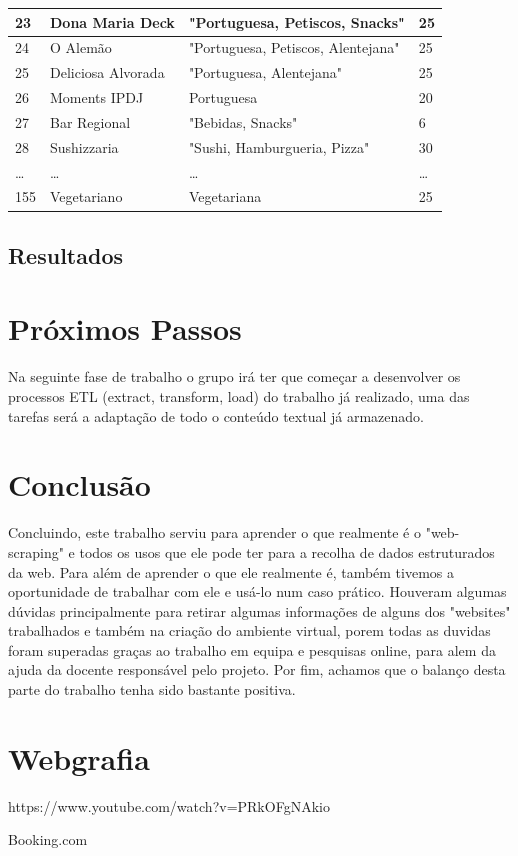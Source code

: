 \documentclass[a4paper,10pt]{article}
\begin{document}
\begin{table}[!ht]
\begin{tabular}{|l|l|l|l|}
      23 & Dona Maria Deck & "Portuguesa, Petiscos, Snacks" & 25 \\ \hline
      24 & O Alemão & "Portuguesa, Petiscos, Alentejana" & 25 \\ \hline
      25 & Deliciosa Alvorada & "Portuguesa, Alentejana" & 25 \\ \hline
      26 & Moments IPDJ & Portuguesa & 20 \\ \hline
      27 & Bar Regional & "Bebidas, Snacks" & 6 \\ \hline
      28 & Sushizzaria & "Sushi, Hamburgueria, Pizza" & 30 \\ \hline
      \ldots & \ldots & \ldots & \ldots \\ \hline
      155 & Vegetariano & Vegetariana & 25 \\ \hline
  \end{tabular}
\end{table}

\newpage

\subsection{Resultados}

\newpage

\section{Próximos Passos}

Na seguinte fase de trabalho o grupo irá ter que começar a desenvolver os processos ETL (extract, transform, load) do trabalho já realizado, uma das tarefas será a adaptação de todo o conteúdo textual já armazenado.

\newpage

\section{Conclusão}

Concluindo, este trabalho serviu para aprender o que realmente é o "web-scraping" e todos os usos que ele pode ter para a recolha de dados estruturados da web. Para além de aprender o que ele realmente é, também tivemos a oportunidade de trabalhar com ele e usá-lo num caso prático. Houveram algumas dúvidas principalmente para retirar algumas informações de alguns dos "websites" trabalhados e também na criação do ambiente virtual, porem todas as duvidas foram superadas graças ao trabalho em equipa e pesquisas online, para alem da ajuda da docente responsável pelo projeto. Por fim, achamos que o balanço desta parte do trabalho tenha sido bastante positiva.

\newpage

\section{Webgrafia}

https://www.youtube.com/watch?v=PRkOFgNAkio

Booking.com

\renewcommand{\bibsection}{}

\end{document}
